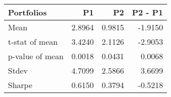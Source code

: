 \begin{tabular}{lrrr}
\toprule
Portfolios & P1 & P2 & P2 - P1 \\
\midrule
Mean & 2.8964 & 0.9815 & -1.9150 \\
t-stat of mean & 3.4240 & 2.1126 & -2.9053 \\
p-value of mean & 0.0018 & 0.0431 & 0.0068 \\
Stdev & 4.7099 & 2.5866 & 3.6699 \\
Sharpe & 0.6150 & 0.3794 & -0.5218 \\
\bottomrule
\end{tabular}
